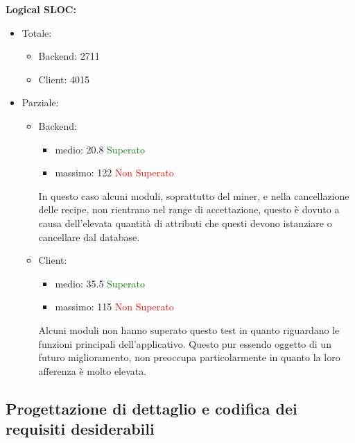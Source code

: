 \begin{description}
				\item \textbf{Logical SLOC:}\\
					\begin{itemize}	
						\item Totale:
							\begin{itemize}
								\item Backend: 2711
								\item Client: 4015
							\end{itemize}
						\item Parziale:
							\begin{itemize}		
								\item Backend:
									\begin{itemize}
										\item medio: 20.8 \textcolor{green}{Superato}
										\item massimo: 122 \textcolor{red}{Non Superato}
									\end{itemize}
					In questo caso alcuni moduli, soprattutto del miner, e nella cancellazione delle recipe, non rientrano nel range di accettazione, questo è dovuto a causa dell’elevata quantità di attributi che questi devono istanziare o cancellare dal database.			
					\item Client:
						\begin{itemize}
							\item medio: 35.5 \textcolor{green}{Superato}
							\item massimo: 115 \textcolor{red}{Non Superato}
						\end{itemize}
					Alcuni moduli non hanno superato questo test in quanto riguardano le funzioni principali dell'applicativo. Questo pur essendo oggetto di un futuro miglioramento, non preoccupa particolarmente in quanto la loro afferenza è molto elevata.
					\end{itemize}
					\end{itemize}
			\end{description}
					
	\subsection{Progettazione di dettaglio e codifica dei requisiti desiderabili}
